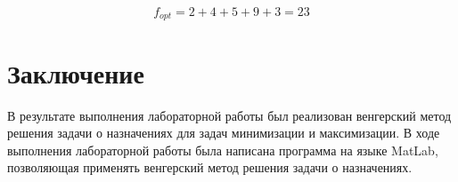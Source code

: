 \documentclass[a4paper,14pt]{article}
\begin{document}
\begin{equation}
f_{opt} = 2+4+5+9+3 = 23
\end{equation}


\section{Заключение}

В результате выполнения лабораторной работы был реализован венгерский метод решения задачи о назначениях для задач минимизации и максимизации. В ходе выполнения лабораторной работы была написана программа на языке MatLab, позволяющая применять венгерский метод решения задачи о назначениях.
\end{document}
